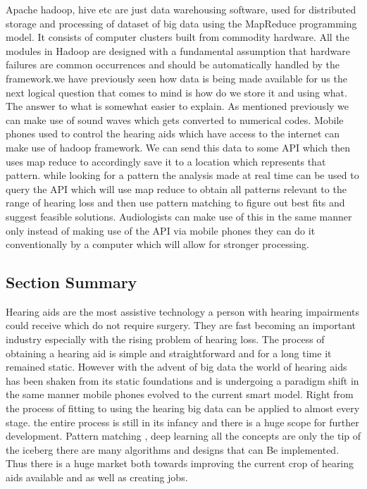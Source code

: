 \documentclass[sigconf]{acmart}
\begin{document}
Apache hadoop, hive etc are just data warehousing software, used for distributed storage and processing of dataset of big data using the MapReduce programming model. It consists of computer clusters built from commodity hardware. All the modules in Hadoop are designed with a fundamental assumption that hardware failures are common occurrences and should be automatically handled by the framework.we have previously seen how data is being made available for us the next logical question that comes to mind is how do we store it and using what. The answer to what is somewhat easier to explain. As mentioned previously we can make use of sound waves which gets converted to numerical codes. Mobile phones used to control the hearing aids which have access to the internet can make use of hadoop framework. We can send this data to some API which then uses map reduce to accordingly save it to a location which represents that pattern. while looking for a pattern the analysis made at real time can be used to query the API which will use map reduce to obtain all patterns relevant to the range of hearing loss and then use pattern matching to figure out best fits and suggest feasible solutions. Audiologists can make use of this in the same manner only instead of making use of the API via mobile phones they can do it conventionally by a computer which will allow for stronger processing.


\subsection{Section Summary}

Hearing aids are the most assistive technology a person with hearing impairments could receive which do not require surgery. They are fast becoming an important industry especially with the rising problem of hearing loss. The process of obtaining a hearing aid is simple and straightforward and for a long time it remained static. However with the advent of big data the world of hearing aids has been shaken from its static foundations and is undergoing a paradigm shift in the same manner mobile phones evolved to the current smart model. Right from the process of fitting to using the hearing big data can be applied to almost every stage. the entire process is still in its infancy and there is a huge scope for further development. Pattern matching , deep learning all the concepts are only the tip of the iceberg there are many algorithms and designs that can Be implemented. Thus there is a huge market both towards improving the current crop of hearing aids available and as well as creating jobs.
\end{document}
